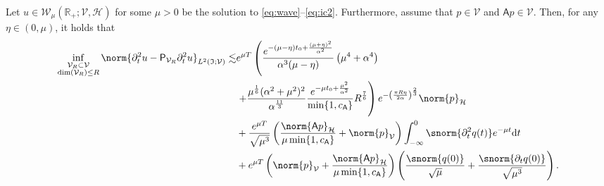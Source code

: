 \begin{lemma}\label{lem:approximation_Hardy_spaces_2}
Let  $u \in \mathcal{W}_\mu(\mathbb{R}_+;\mathcal{V},\mathcal{H})$
for some $\mu>0$ be the solution to \eqref{eq:wave}--\eqref{eq:ic2}.
Furthermore, assume that $p \in \mathcal{V}$ and 
$\mathsf{A} p \in \mathcal{V}$. Then, for any $\eta \in (0,\mu)$, it holds that
\begin{equation}\label{eq:bound_inf_V}
\begin{aligned}
	\inf_{
	\substack{
		\mathcal{V}_R \subset \mathcal{V}
		\\
		\normalfont\text{dim}(\mathcal{V}_R)\leq R	
	}
	}	
	\norm{
		\partial^2_t u
		-
		\mathsf{P}_{\mathcal{V}_R}
		\partial^2_t u
	}_{L^2(\mathfrak{I};\mathcal{V})}
    \lesssim
    &
    e^{\mu T}
    \left(
    \frac{e^{-(\mu-\eta) t_0+\frac{(\mu+\eta)^2}{\alpha^2}}}{\alpha^3(\mu-\eta)}
    \left(
		\mu^4
		+
		\alpha^4
    \right)
        \right.
        \\
        &
        \left.
        +
   \frac{
   	   \mu^{\frac{1}{6}}
   		(\alpha^2+\mu^2)^2 
   }{
   	\alpha^{\frac{11}{3}}
   }
    \frac{
        e^{-\mu t_0 + \frac{\mu^2}{\alpha^2}}
        }{
        \min\{1, c_{\mathsf{A}}\}
    }
    R^\frac{7}{6}
    \right)
	e^{
		-\left(\frac{\pi R \eta}{2\alpha} \right)^{\frac{2}{3}}
	}
	 \norm{p}_\mathcal{H}
	\\
	&
	+
    \frac{e^{\mu T}}{\sqrt{\mu^3}}
    \left(
    \frac{
        \norm{\mathsf{A}p}_{\mathcal{H}}
        }{
        \mu  \min\{1, c_{\mathsf{A}}\}
        }
        +
        \norm{p}_\mathcal{V}
    \right)
	\int_{-\infty}^{0}
	\snorm{\partial^2_t  q (t)}
	e^{-\mu t}
	\normalfont\text{d} t
	\\
	&
	+
	e^{\mu T}
	\left(
      	\norm{p}_{\mathcal{V}}
      	+
      	\frac{
			\norm{\mathsf{A}p}_{\mathcal{H}}
		}{
			\mu \min\{1, c_{\mathsf{A}}\}
		}
	\right)
	\left(
		\frac{\snorm{q(0)}}{\sqrt{\mu}}
		+
		\frac{\snorm{\partial_t q(0)}}{\sqrt{\mu^3}}
	\right).
\end{aligned}
\end{equation}
\end{lemma}

